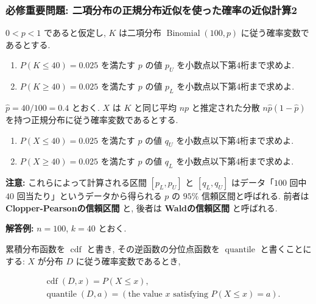 \documentclass[10pt, a4paper,xelatex,ja=standard]{bxjsarticle}
\newcommand\op{\operatorname}
\begin{document}
    \hypertarget{ux5fc5ux4feeux91cdux8981ux554fux984c-ux4e8cux9805ux5206ux5e03ux306eux6b63ux898fux5206ux5e03ux8fd1ux4f3cux3092ux4f7fux3063ux305fux78baux7387ux306eux8fd1ux4f3cux8a08ux7b972}{%
\subsubsection{必修重要問題:
二項分布の正規分布近似を使った確率の近似計算2}\label{ux5fc5ux4feeux91cdux8981ux554fux984c-ux4e8cux9805ux5206ux5e03ux306eux6b63ux898fux5206ux5e03ux8fd1ux4f3cux3092ux4f7fux3063ux305fux78baux7387ux306eux8fd1ux4f3cux8a08ux7b972}}

\(0 < p < 1\) であると仮定し, \(K\) は二項分布 \(\op{Binomial}(100, p)\)
に従う確率変数であるとする.

\begin{enumerate}
\def\labelenumi{(\arabic{enumi})}
\item
  \(P(K \le 40) = 0.025\) を満たす \(p\) の値 \(p_U\)
  を小数点以下第4桁まで求めよ.
\item
  \(P(K \ge 40) = 0.025\) を満たす \(p\) の値 \(p_L\)
  を小数点以下第4桁まで求めよ.
\end{enumerate}

\(\hat{p}=40/100=0.4\) とおく. \(X\) は \(K\) と同じ平均 \(np\)
と推定された分散 \(n\hat{p}(1-\hat{p})\)
を持つ正規分布に従う確率変数であるとする.

\begin{enumerate}
\def\labelenumi{(\arabic{enumi})}
\setcounter{enumi}{2}
\item
  \(P(X \le 40) = 0.025\) を満たす \(p\) の値 \(q_U\)
  を小数点以下第4桁まで求めよ.
\item
  \(P(X \ge 40) = 0.025\) を満たす \(p\) の値 \(q_L\)
  を小数点以下第4桁まで求めよ.
\end{enumerate}

\textbf{注意:} これらによって計算される区間 \([p_L, p_U]\) と
\([q_L, q_U]\) はデータ「\(100\) 回中 \(40\)
回当たり」というデータから得られる \(p\) の \(95\%\) 信頼区間と呼ばれる.
前者は \textbf{Clopper-Pearsonの信頼区間} と, 後者は
\textbf{Waldの信頼区間} と呼ばれる.

    \textbf{解答例:} \(n=100\), \(k=40\) とおく.

累積分布函数を \(\op{cdf}\) と書き, その逆函数の分位点函数を
\(\op{quantile}\) と書くことにする: \(X\) が分布 \(D\)
に従う確率変数であるとき,

\[
\begin{aligned}
&
\op{cdf}(D, x) = P(X \le x),
\\ &
\op{quantile}(D, a) = (\text{the value $x$ satisfying $P(X \le x) = a$}).
\end{aligned}
\]
\end{document}
